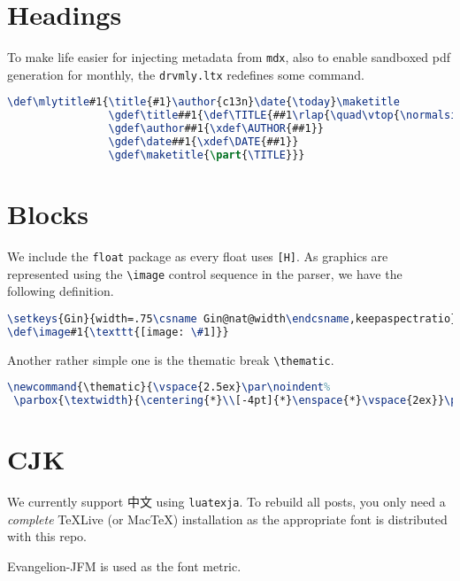 \section{Headings}
To make life easier for injecting metadata from \verb!mdx!, also to enable sandboxed pdf generation for monthly, the \verb!drvmly.ltx! redefines some command.\par
\begin{lstlisting}[language=TeX]
\def\mlytitle#1{\title{#1}\author{c13n}\date{\today}\maketitle
                \gdef\title##1{\def\TITLE{##1\rlap{\quad\vtop{\normalsize\hbox{\AUTHOR}\hbox{\DATE}}}}}
                \gdef\author##1{\xdef\AUTHOR{##1}}
                \gdef\date##1{\xdef\DATE{##1}}
                \gdef\maketitle{\part{\TITLE}}}
\end{lstlisting}
\section{Blocks}
We include the \verb!float! package as every float uses \verb![H]!. As graphics are represented using the \verb!\image! control sequence in the parser, we have the following definition.\par
\begin{lstlisting}[language=TeX]
\setkeys{Gin}{width=.75\csname Gin@nat@width\endcsname,keepaspectratio}
\def\image#1{\texttt{[image: \#1]}}
\end{lstlisting}
Another rather simple one is the thematic break \verb!\thematic!.\par
\begin{lstlisting}[language=TeX]
\newcommand{\thematic}{\vspace{2.5ex}\par\noindent%
 \parbox{\textwidth}{\centering{*}\\[-4pt]{*}\enspace{*}\vspace{2ex}}\par}
\end{lstlisting}
\section{CJK}
We currently support 中文 using \verb!luatexja!. To rebuild all posts, you only need a \textit{complete} TeXLive (or MacTeX) installation as the appropriate font is distributed with this repo.\par
Evangelion-JFM is used as the font metric.\par
